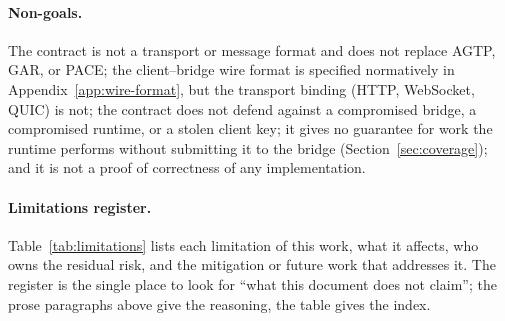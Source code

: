 \paragraph{Non-goals.} The contract is not a transport or message
format and does not replace AGTP, GAR, or PACE; the client--bridge
wire format is specified normatively in
Appendix~\ref{app:wire-format}, but the transport binding (HTTP,
WebSocket, QUIC) is not; the contract does not defend against a compromised bridge, a compromised
runtime, or a stolen client key; it gives no guarantee for work the
runtime performs without submitting it to the bridge (Section~\ref{sec:coverage});
and it is not a proof of correctness of any implementation.

\paragraph{Limitations register.}
Table~\ref{tab:limitations} lists each limitation of this work, what
it affects, who owns the residual risk, and the mitigation or future
work that addresses it. The register is the single place to look for
``what this document does not claim''; the prose paragraphs above
give the reasoning, the table gives the index.

